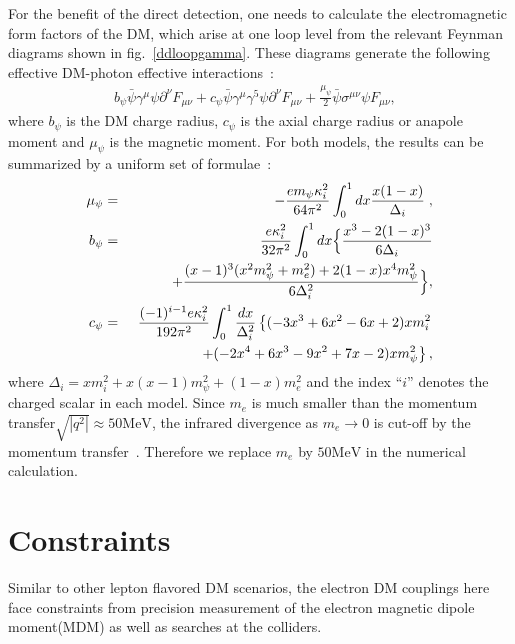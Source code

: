 \documentclass[aps,prd,letterpaper,showpacs,twocolumn,preprintnumbers,floatfix,superscriptaddress]{revtex4-1}
\begin{document}
%
For the benefit of the direct detection, one needs to calculate the electromagnetic form factors of the DM, which arise at one loop level from the relevant Feynman diagrams shown in fig.~\ref{ddloopgamma}.
%
These diagrams generate the following effective DM-photon effective interactions~\cite{Chao:2016lqd}:
\begin{eqnarray}
b_{\psi} \bar{\psi} \gamma^{\mu} \psi \partial^{\nu} F_{\mu\nu} 
+ c_{\psi} \bar{\psi} \gamma^{\mu} \gamma^5 \psi \partial^{\nu} F_{\mu\nu} +
\frac{\mu_{\psi}}{2} \bar{\psi} \sigma^{\mu\nu} \psi F_{\mu\nu} , \ \  \ 
  \label{eq:dm-photon}
\end{eqnarray}
%
%
where $b_\psi$ is the DM charge radius, $c_\psi$ is the axial charge radius or anapole moment and 
$\mu_\psi$ is the magnetic moment. For both models, the results can be summarized by a uniform 
set of formulae~\cite{Chao:2016lqd}:
\begin{eqnarray}
  \mu_{\psi} &=& -\frac{e m_{\psi}  \kappa_i^2 }{64\pi^2} \int^1_0 dx \frac{x(1-x) }{\Delta_i} \; , \nonumber \\
  b_{\psi} &=&{e \kappa^2_i \over 32 \pi^2 } \int_0^1 d x \Big\{{ x^3 -2(1-x)^3\over 6 \Delta_i }\nonumber \\
&& \hspace{1cm} + {(x-1)^3 (x^2 m_\psi^2+{m_e^2})  +2(1-x)x^4 m_\psi^2 \over 6 \Delta_i^2 }  \Big\} , \label{electromag} \nonumber \\
  c_{\psi} & =&  \frac{(-1)^{i-1}e \kappa_i^2 }{192 \pi^2} \int^1_0 \frac{dx}{\Delta_i^2} \left\{  (-3x^3+6x^2-6x+2) x m_i^2 \right. \nonumber \\
		  && \hspace{1.5cm} \left.  +(-2x^4+6x^3-9x^2+7x-2) x m_{\psi }^2 \right\} ,\nonumber
\label{eq:dmresults}
\end{eqnarray}
%
where  $\Delta_i= x {m}_i^2 + x(x-1)m_\psi^2 + (1-x){m_e^2}$ and the index
``$i$'' denotes the charged scalar in each model. 
%
%
Since $m_e$ is much smaller than the momentum transfer$\sqrt{|q^2|}\approx 50\text{MeV}$,
the infrared divergence as $m_e \rightarrow 0$ is cut-off by the momentum transfer~\cite{Bai:2013iqa}. Therefore we 
replace $m_e$ by $50\text{MeV}$ in the numerical calculation.


\section{Constraints}
%
Similar to other lepton flavored DM scenarios, the electron DM couplings here face constraints from 
precision measurement of the electron magnetic dipole moment(MDM) as well as searches at the colliders.
\end{document}
